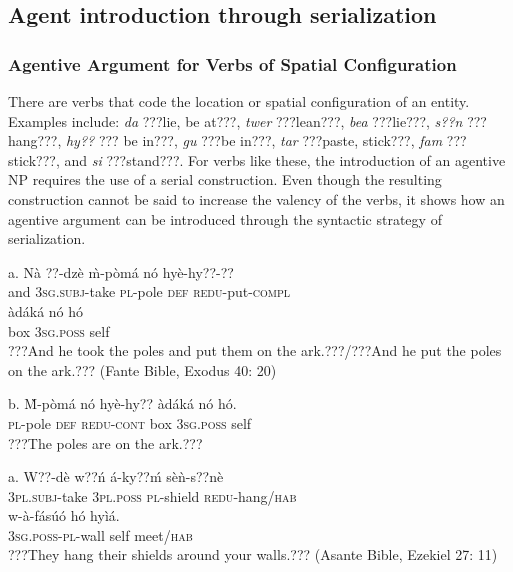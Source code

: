 \documentclass[output=paper]{langsci/langscibook}
\begin{document}
\subsection{Agent introduction through serialization}
\subsubsection{Agentive Argument for Verbs of Spatial Configuration}

There are verbs that code the location or spatial configuration of an entity. Examples  include: \emph{da} ???lie, be at???, \emph{twer} ???lean???, \emph{bea} ???lie???, \emph{s??n} ???hang???, \emph{hy??} ??? be in???, \emph{gu} ???be in???, \emph{tar} ???paste, stick???, \emph{fam} ???stick???, and \emph{si} ???stand???. For verbs like these, the introduction of an agentive NP requires the use of a serial construction. Even though the resulting construction cannot be said to increase the valency of the verbs, it shows how an agentive argument can be introduced through the syntactic strategy of serialization.


\ea
\gll a.  Nà  ??{}-dzè     \`{m}-pòmá   nó  hyè-hy??-?? \\
             and  \textsc{3sg.subj}{}-take  \textsc{pl}{}-pole    \textsc{def}  \textsc{redu}{}-put-\textsc{compl}  \\
\gll   àdáká     nó    hó  \\
       box    \textsc{3sg.poss}  self  \\
\glt    ???And he took the poles and put them on the ark.???/???And he put the poles on the ark.??? (Fante Bible, Exodus 40: 20)
\z

\ea
\gll  b.  \`{M}-pòmá   nó   hyè-hy??   àdáká  nó    hó.\\
       \textsc{pl}{}-pole    \textsc{def}  \textsc{redu-cont}  box  \textsc{3sg.poss}  self  \\
\glt   ???The poles are on the ark.???
\z

\ea
\gll a.   W??-dè    w??ń    á-ky??ḿ   sèǹ-s??nè \\
       \textsc{3pl.subj}{}-take  \textsc{3pl.poss}  \textsc{pl}{}-shield  \textsc{redu}{}-hang/\textsc{hab}\\
\gll   w-à-fásúó    hó   hyìá.    \\
       \textsc{3sg.poss-pl}{}-wall  self  meet/\textsc{hab}  \\
\glt ???They hang their shields around your walls.??? (Asante Bible, Ezekiel 27: 11)
\z
\end{document}
